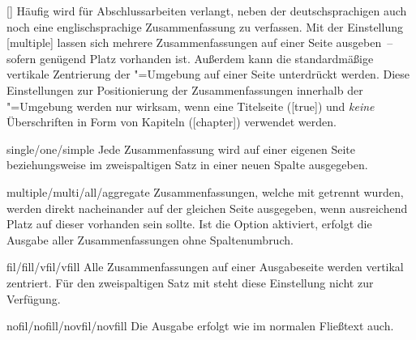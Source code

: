 \begin{Declaration}{[\PSet]}
Häufig wird für Abschlussarbeiten verlangt, neben der deutschsprachigen auch 
noch eine englischsprachige Zusammenfassung zu verfassen. Mit der Einstellung 
[multiple] lassen sich mehrere Zusammenfassungen auf einer 
Seite ausgeben~-- sofern genügend Platz vorhanden ist. Außerdem kann die 
standardmäßige vertikale Zentrierung der "=Umgebung 
auf einer Seite unterdrückt werden. Diese Einstellungen zur Positionierung der 
Zusammenfassungen innerhalb der "=Umgebung werden nur 
wirksam, wenn eine Titelseite ([true]) und \emph{keine} 
Überschriften in Form von Kapiteln ([chapter]) verwendet 
werden.
%
\begin{values}
\item[single/one/simple]
  Jede Zusammenfassung wird auf einer eigenen Seite
  beziehungsweise im zweispaltigen Satz in einer neuen Spalte ausgegeben.
\item[multiple/multi/all/aggregate]
  Zusammenfassungen, welche mit  getrennt wurden, werden 
  direkt nacheinander auf der gleichen Seite ausgegeben, wenn ausreichend Platz 
  auf dieser vorhanden sein sollte. Ist die Option  aktiviert,
  erfolgt die Ausgabe aller Zusammenfassungen ohne Spaltenumbruch.
\item[fil/fill/vfil/vfill]
  Alle Zusammenfassungen auf einer Ausgabeseite werden vertikal zentriert. Für 
  den zweispaltigen Satz mit  steht diese Einstellung nicht 
  zur Verfügung.
\item[nofil/nofill/novfil/novfill]
  Die Ausgabe erfolgt wie im normalen Fließtext auch.
\end{values}
\end{Declaration}

